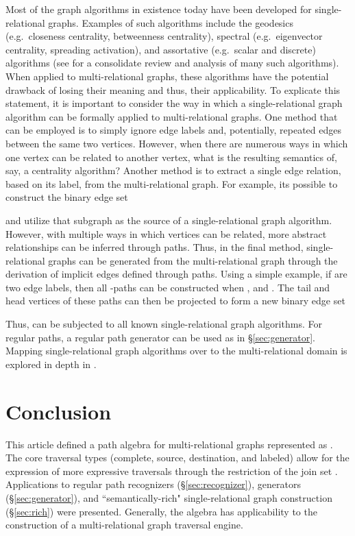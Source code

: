 \documentclass[10pt,conference,letterpaper]{IEEEtran}
\begin{document}
Most of the graph algorithms in existence today have been developed for single-relational graphs. Examples of such algorithms include the geodesics (e.g.~closeness centrality, betweenness centrality), spectral (e.g.~eigenvector centrality, spreading activation), and assortative (e.g.~scalar and discrete) algorithms (see \cite{netanal:brandes2005} for a consolidate review and analysis of many such algorithms). When applied to multi-relational graphs, these algorithms have the potential drawback of losing their meaning and thus, their applicability. To explicate this statement, it is important to consider the way in which a single-relational graph algorithm can be formally applied to multi-relational graphs. One method that can be employed is to simply ignore edge labels and, potentially, repeated edges between the same two vertices. However, when there are numerous ways in which one vertex can be related to another vertex, what is the resulting semantics of, say, a centrality algorithm? Another method is to extract a single edge relation, based on its label, from the multi-relational graph. For example, its possible to construct the binary edge set

and utilize that subgraph as the source of a single-relational graph algorithm. However, with multiple ways in which vertices can be related, more abstract relationships can be inferred through paths. Thus, in the final method, single-relational graphs can be generated from the multi-relational graph through the derivation of implicit edges defined through paths. Using a simple example, if  are two edge labels, then all -paths can be constructed when ,  and . The tail and head vertices of these paths can then be projected to form a new binary edge set

Thus,  can be subjected to all known single-relational graph algorithms. For regular paths, a regular path generator can be used as in \S \ref{sec:generator}. Mapping single-relational graph algorithms over to the multi-relational domain is explored in depth in \cite{pathalg:rodriguez2009}.

\section{Conclusion}

This article defined a path algebra for multi-relational graphs represented as . The core traversal types (complete, source, destination, and labeled) allow for the expression of more expressive traversals through the restriction of the join set . Applications to regular path recognizers (\S \ref{sec:recognizer}), generators (\S \ref{sec:generator}), and ``semantically-rich" single-relational graph construction (\S \ref{sec:rich}) were presented. Generally, the algebra has applicability to the construction of a multi-relational graph traversal engine.
\end{document}
